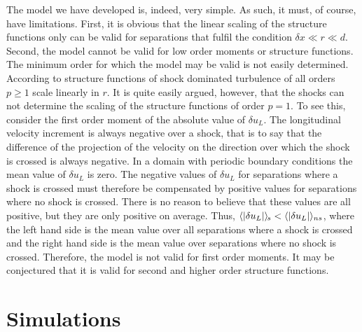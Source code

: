 \documentclass{jfm}
\let\ge=\geqslant  \let\geq=\geqslant
\newcommand{\means}[1]{{\langle #1 \rangle_{\hspace{-0.4mm}s}}}
\begin{document}
The model we have developed is, indeed, very simple. As such, it must, of course, have limitations. First, it is obvious that  the linear scaling of the structure functions only can be valid for separations  that fulfil the condition $ \delta x \ll r \ll d $. Second, the model cannot be valid for low order moments or structure functions. The minimum order for which the model may be valid is not easily determined. 
According to  \cite{BouchaudMezardParisi1995} structure functions of shock dominated turbulence of all orders $ p  \ge 1 $ scale linearly in $ r $. It is quite easily argued, however, that the shocks can not determine the scaling of the structure functions of order $ p=1 $. 
To see this, consider the first order moment of the absolute value of $ \delta u_L $. 
The longitudinal velocity increment is always negative over a shock, that is to say that the difference of the projection of the velocity on the direction over which the shock is crossed is always negative. In a domain with periodic boundary conditions the mean value of $ \delta u_L $   is zero. The negative values of $ \delta u_L $ for separations where a shock is crossed must therefore be compensated by positive values for separations where no shock is crossed. There is no reason to believe that these values are all positive,  but they are only positive on average. Thus, 
$ \means{ |\delta u_L | } < \langle | \delta u_L | \rangle _{ns} $, where the left hand side is the mean value over all separations where a shock is crossed and the right hand side is the mean value over separations where no shock is crossed.  Therefore, the model is not valid for first order moments. It may be conjectured that it is valid for 
second and higher order structure functions. 








\section{Simulations}
\end{document}
